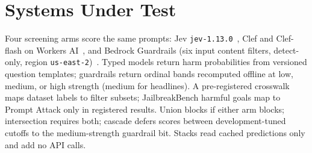 \section{Systems Under Test}
\label{sec:systems}

Four screening arms score the same prompts: Jev \texttt{jev-1.13.0}~\cite{typesafe2026jevmodels}, Clef and Clef-flash on Workers AI~\cite{cloudflare2026clef,cloudflare2026clefflash}, and Bedrock Guardrails (six input content filters, detect-only, region \texttt{us-east-2})~\cite{aws2024bedrockguardrails}.
Typed models return harm probabilities from versioned question templates; guardrails return ordinal bands recomputed offline at low, medium, or high strength (medium for headlines).
A pre-registered crosswalk maps dataset labels to filter subsets; JailbreakBench harmful goals map to Prompt Attack only in registered results.
Union blocks if either arm blocks; intersection requires both; cascade defers scores between development-tuned cutoffs to the medium-strength guardrail bit.
Stacks read cached predictions only and add no API calls.

